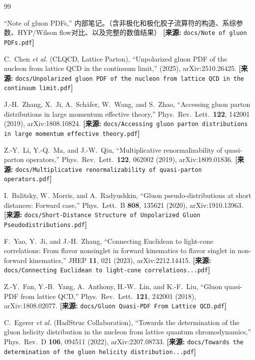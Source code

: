 \documentclass[12pt,a4paper]{ctexart}
\theoremstyle{definition}
\begin{document}
\begin{thebibliography}{99}

``Note of gluon PDFs,''
内部笔记。（含非极化和极化胶子流算符的构造、系综参数、HYP/Wilson flow对比、以及完整的数值结果）
\quad\textbf{[来源:} \texttt{docs/Note of gluon PDFs.pdf}\textbf{]}

C.~Chen \textit{et al.} (CLQCD, Lattice Parton),
``Unpolarized gluon PDF of the nucleon from lattice QCD in the continuum limit,''
(2025), arXiv:2510.26425.
\quad\textbf{[来源:} \texttt{docs/Unpolarized gluon PDF of the nucleon from lattice QCD in the continuum limit.pdf}\textbf{]}

J.-H.~Zhang, X.~Ji, A.~Sch\"afer, W.~Wang, and S.~Zhao,
``Accessing gluon parton distributions in large momentum effective theory,''
Phys.\ Rev.\ Lett.\ \textbf{122}, 142001 (2019), arXiv:1808.10824.
\quad\textbf{[来源:} \texttt{docs/Accessing gluon parton distributions in large momentum effective theory.pdf}\textbf{]}

Z.-Y.~Li, Y.-Q.~Ma, and J.-W.~Qiu,
``Multiplicative renormalizability of quasi-parton operators,''
Phys.\ Rev.\ Lett.\ \textbf{122}, 062002 (2019), arXiv:1809.01836.
\quad\textbf{[来源:} \texttt{docs/Multiplicative renormalizability of quasi-parton operators.pdf}\textbf{]}

I.~Balitsky, W.~Morris, and A.~Radyushkin,
``Gluon pseudo-distributions at short distances: Forward case,''
Phys.\ Lett.\ B \textbf{808}, 135621 (2020), arXiv:1910.13963.
\quad\textbf{[来源:} \texttt{docs/Short-Distance Structure of Unpolarized Gluon Pseudodistributions.pdf}\textbf{]}

F.~Yao, Y.~Ji, and J.-H.~Zhang,
``Connecting Euclidean to light-cone correlations: From flavor nonsinglet in forward kinematics to flavor singlet in non-forward kinematics,''
JHEP \textbf{11}, 021 (2023), arXiv:2212.14415.
\quad\textbf{[来源:} \texttt{docs/Connecting Euclidean to light-cone correlations...pdf}\textbf{]}

Z.-Y.~Fan, Y.-B.~Yang, A.~Anthony, H.-W.~Lin, and K.-F.~Liu,
``Gluon quasi-PDF from lattice QCD,''
Phys.\ Rev.\ Lett.\ \textbf{121}, 242001 (2018), arXiv:1808.02077.
\quad\textbf{[来源:} \texttt{docs/Gluon Quasi-PDF From Lattice QCD.pdf}\textbf{]}

C.~Egerer \textit{et al.} (HadStruc Collaboration),
``Towards the determination of the gluon helicity distribution in the nucleon from lattice quantum chromodynamics,''
Phys.\ Rev.\ D \textbf{106}, 094511 (2022), arXiv:2207.08733.
\quad\textbf{[来源:} \texttt{docs/Towards the determination of the gluon helicity distribution...pdf}\textbf{]}


\end{thebibliography}
\end{document}
